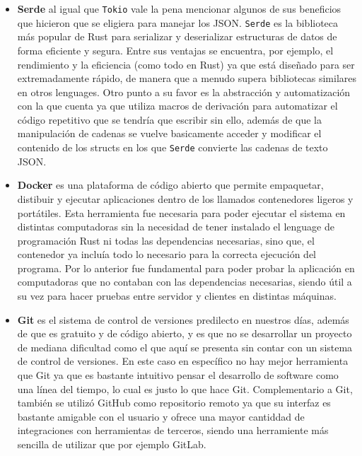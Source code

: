 \documentclass[12pt]{article}
\begin{document}
\begin{itemize}
\item \textbf{Serde} al igual que \texttt{Tokio} vale la pena mencionar algunos de sus beneficios que hicieron que se eligiera para manejar los JSON. \texttt{Serde} es la biblioteca más popular de Rust para serializar y deserializar estructuras de datos de forma eficiente y segura. Entre sus ventajas se encuentra, por ejemplo, el rendimiento y la eficiencia (como todo en Rust) ya que está diseñado para ser extremadamente rápido, de manera que a menudo supera bibliotecas similares en otros lenguages. Otro punto a su favor es la abstracción y automatización con la que cuenta ya que utiliza macros de derivación para automatizar el código repetitivo que se tendría que escribir sin ello, además de que la manipulación de cadenas se vuelve basicamente acceder y modificar el contenido de los structs en los que \texttt{Serde} convierte las cadenas de texto JSON.

  \item \textbf{Docker} es una plataforma de código abierto que permite empaquetar, distibuir y ejecutar aplicaciones dentro de los llamados contenedores ligeros y portátiles. Esta herramienta fue necesaria para poder ejecutar el sistema en distintas computadoras sin la necesidad de tener instalado el lenguage de programación Rust ni todas las dependencias necesarias, sino que, el contenedor ya incluía todo lo necesario para la correcta ejecución del programa. Por lo anterior fue fundamental para poder probar la aplicación en computadoras que no contaban con las dependencias necesarias, siendo útil a su vez para hacer pruebas entre servidor y clientes en distintas máquinas.
  
    \item \textbf{Git} es el sistema de control de versiones predilecto en nuestros días, además de que es gratuito y de código abierto, y es que no se desarrollar un proyecto de mediana dificultad como el que aquí se presenta sin contar con un sistema de control de versiones. En este caso en específico no hay mejor herramienta que Git ya que es bastante intuitivo pensar el desarrollo de software como una línea del tiempo, lo cual es justo lo que hace Git. Complementario a Git, también se utilizó GitHub como repositorio remoto ya que su interfaz es bastante amigable con el usuario y ofrece una mayor cantiddad de integraciones con herramientas de terceros, siendo una herramiente más sencilla de utilizar que por ejemplo GitLab.
\end{itemize}

\end{document}
